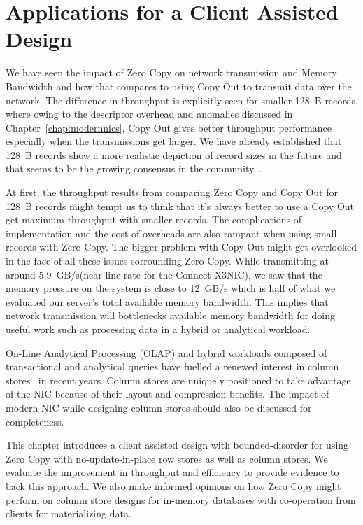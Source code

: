
\chapter{Applications for a Client Assisted Design}
\label{chap:applications}

We have seen the impact of Zero Copy on network transmission and Memory Bandwidth and how that 
compares to using Copy Out to transmit data over the network. The difference
in throughput is explicitly seen for smaller 128~B records, where owing to the descriptor overhead and anomalies discussed 
in Chapter~\ref{chap:modernnics}, Copy Out gives better throughput performance especially when the transmissions get larger.
We have already established that 128~B records show a more realistic depiction of record sizes in the future
and that seems to be the growing consensus in the community~\cite{fb-memcache,fb-workload}. 

At first, the throughput results from comparing Zero Copy and Copy Out for 128~B 
records might tempt us to think that it's always better to use a Copy Out get maximum throughput with smaller records.
The complications of implementation and the cost of overheads are also rampant when using small records with Zero Copy.
The bigger problem with Copy Out might get overlooked in the face of all these issues sorrounding Zero Copy.
While transmitting at around 5.9~GB/s(near line rate for the Connect-X3\textregistered NIC),
we saw that the memory pressure on the system is close to 12~GB/s which is half of what we evaluated our server's total available memory bandwidth. 
This implies that network transmission will bottlenecks available memory bandwidth for doing useful work such as processing data in a hybrid or analytical workload.

On-Line Analytical Processing (OLAP) and hybrid workloads composed of transactional and analytical queries have fuelled a renewed interest in column stores~\cite{cstore,cstorevsrowstore} in recent years. 
Column stores are uniquely positioned to take advantage of the NIC because of their layout and compression benefits.
 The impact of modern NIC while designing column stores should also be discussed for completeness. 

This chapter introduces a client assisted design with bounded-disorder for using Zero Copy with no-update-in-place row stores as well as column stores. 
We evaluate the improvement in throughput and efficiency to provide evidence to back this approach.
We also make informed opinions on how Zero Copy might perform on column store designs 
for in-memory databases with co-operation from clients for materializing data.


